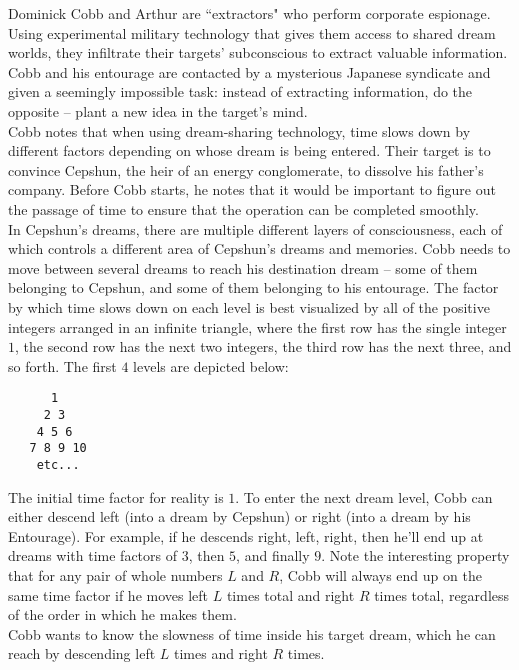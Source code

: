 
\noindent Dominick Cobb and Arthur are ``extractors" who perform corporate espionage. Using experimental military technology that gives them access to shared dream worlds, they infiltrate their targets' subconscious to extract valuable information. Cobb and his entourage are contacted by a mysterious Japanese syndicate and given a seemingly impossible task: instead of extracting information, do the opposite -- plant a new idea in the target's mind.\\

Cobb notes that when using dream-sharing technology, time slows down by different factors depending on whose dream is being entered. Their target is to convince Cepshun, the heir of an energy conglomerate, to dissolve his father's company. Before Cobb starts, he notes that it would be important to figure out the passage of time to ensure that the operation can be completed smoothly.\\

In Cepshun's dreams, there are multiple different layers of consciousness, each of which controls a different area of Cepshun's dreams and memories. Cobb needs to move between several dreams to reach his destination dream -- some of them belonging to Cepshun, and some of them belonging to his entourage. The factor by which time slows down on each level is best visualized by all of the positive integers arranged in an infinite triangle, where the first row has the single integer $1$, the second row has the next two integers, the third row has the next three, and so forth. The first $4$ levels are depicted below:

\begin{verbatim}
      1
     2 3
    4 5 6
   7 8 9 10
    etc...
\end{verbatim}

The initial time factor for reality is $1$. To enter the next dream level, Cobb can either descend left (into a dream by Cepshun) or right (into a dream by his Entourage). For example, if he descends right, left, right, then he'll end up at dreams with time factors of $3$, then $5$, and finally $9$. Note the interesting property that for any pair of whole numbers $L$ and $R$, Cobb will always end up on the same time factor if he moves left $L$ times total and right $R$ times total, regardless of the order in which he makes them.\\

Cobb wants to know the slowness of time inside his target dream, which he can reach by descending left $L$ times and right $R$ times.

